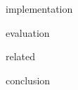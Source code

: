 \documentclass[12pt,a4paper,oneside]{report}
\begin{document}
\singlespacing

\onehalfspacing

\tableofcontents
\newpage









 {implementation}

 {evaluation}

 {related}

 {conclusion}



\end{document}
